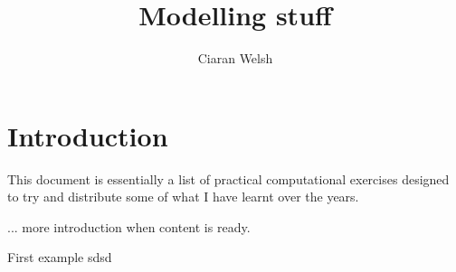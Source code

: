 \documentclass{article}
\title{Modelling stuff}
\author{Ciaran Welsh}
\newcommand{\task}[1]{\begin{taskBox}
                          \textbf{Task:} #1
\end{taskBox}}
\begin{document}
    \maketitle
    \tableofcontents

    \section{Introduction}
    This document is essentially a list of practical computational exercises designed to try and distribute some of what
    I have learnt over the years.

    ... more introduction when content is ready.
    \begin{Task}{First example}
        sdsd
    \end{Task}

\end{document}

